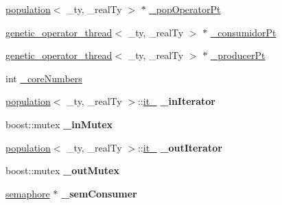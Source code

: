 \begin{DoxyCompactItemize}
\item 
\hyperlink{classpopulation}{population}$<$ \_\-ty, \_\-realTy $>$ $\ast$ \hyperlink{classgenetic__operator__thread_ae0bb1f4c8c30c5557eefc870d2767d66}{\_\-popOperatorPt}
\item 
\hyperlink{classgenetic__operator__thread}{genetic\_\-operator\_\-thread}$<$ \_\-ty, \_\-realTy $>$ $\ast$ \hyperlink{classgenetic__operator__thread_ad88e4f6c5afb05bbc55d5f44bce88ba2}{\_\-consumidorPt}
\item 
\hyperlink{classgenetic__operator__thread}{genetic\_\-operator\_\-thread}$<$ \_\-ty, \_\-realTy $>$ $\ast$ \hyperlink{classgenetic__operator__thread_af325a8a1c9964fc0eac9e2eeda670499}{\_\-producerPt}
\item 
int \hyperlink{classgenetic__operator__thread_a886d986c24ceb36bff5a77bf58447be0}{\_\-coreNumbers}
\item 
\hypertarget{classgenetic__operator__thread_a33d19c478eee6deee0a1fcb43272cc92}{
\hyperlink{classpopulation}{population}$<$ \_\-ty, \_\-realTy $>$::\hyperlink{classgenetic__operator__thread_ac5a153e12dd6711746126c48edba271a}{it\_\-} {\bfseries \_\-inIterator}}
\label{classgenetic__operator__thread_a33d19c478eee6deee0a1fcb43272cc92}

\item 
\hypertarget{classgenetic__operator__thread_ac403a8cd7cd497e8d98bdd40f417771c}{
boost::mutex {\bfseries \_\-inMutex}}
\label{classgenetic__operator__thread_ac403a8cd7cd497e8d98bdd40f417771c}

\item 
\hypertarget{classgenetic__operator__thread_a11bd7c84a7feb28bfed6e1ea52964fd1}{
\hyperlink{classpopulation}{population}$<$ \_\-ty, \_\-realTy $>$::\hyperlink{classgenetic__operator__thread_ac5a153e12dd6711746126c48edba271a}{it\_\-} {\bfseries \_\-outIterator}}
\label{classgenetic__operator__thread_a11bd7c84a7feb28bfed6e1ea52964fd1}

\item 
\hypertarget{classgenetic__operator__thread_a923a2cd5dfdd1478677f5a05f5dd4063}{
boost::mutex {\bfseries \_\-outMutex}}
\label{classgenetic__operator__thread_a923a2cd5dfdd1478677f5a05f5dd4063}

\item 
\hypertarget{classgenetic__operator__thread_a8e9f788e9d5e9c0ee96de0505525196c}{
\hyperlink{classsemaphore}{semaphore} $\ast$ {\bfseries \_\-semConsumer}}
\label{classgenetic__operator__thread_a8e9f788e9d5e9c0ee96de0505525196c}


\end{DoxyCompactItemize}
